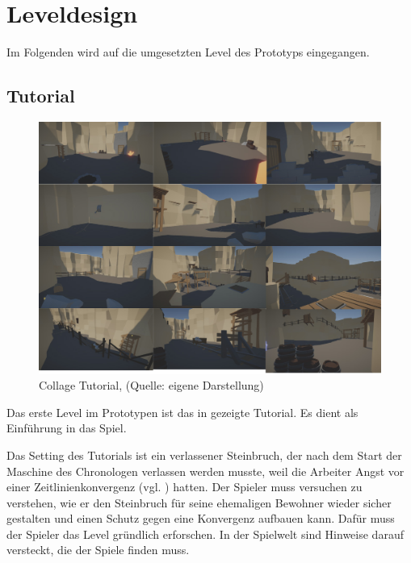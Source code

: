 \section{Leveldesign}

Im Folgenden wird auf die umgesetzten Level des Prototyps eingegangen.

\subsection{Tutorial}

\begin{figure}[ht]
\centering
\includegraphics[width=1\linewidth]{content/pictures/Tutorial - A Fraction of Time.jpg}
\caption{Collage Tutorial, (Quelle: eigene Darstellung)}
\label{fig:collage_tutorial}
\end{figure}

Das erste Level im Prototypen ist das in  gezeigte Tutorial. Es dient als Einführung in das Spiel. 

Das Setting des Tutorials ist ein verlassener Steinbruch, der nach dem Start der Maschine des Chronologen verlassen werden musste, weil die Arbeiter Angst vor einer Zeitlinienkonvergenz (vgl. ) hatten. Der Spieler muss versuchen zu verstehen, wie er den Steinbruch für seine ehemaligen Bewohner wieder sicher gestalten und einen Schutz gegen eine Konvergenz aufbauen kann.
Dafür muss der Spieler das Level gründlich erforschen. In der Spielwelt sind Hinweise darauf versteckt, die der Spiele finden muss.

